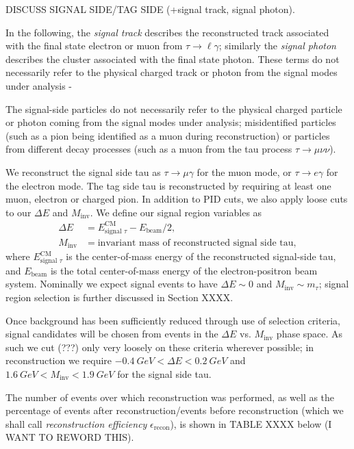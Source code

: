 \documentclass[12pt]{thesis}  %
\begin{document}
DISCUSS SIGNAL SIDE/TAG SIDE (+signal track, signal photon).


In the following, the \emph{signal track} describes the reconstructed track associated with the final state electron or muon from $\tau\to\ell\gamma$; similarly the \emph{signal photon} describes the cluster associated with the final state photon. These terms do not necessarily refer to the physical charged track or photon from the signal modes under analysis - 

The signal-side particles do not necessarily refer to the physical charged particle or photon coming from the signal modes under analysis; misidentified particles (such as a pion being identified as a muon during reconstruction) or particles from different decay processes (such as a muon from the tau process $\tau\to\mu\nu\nu$).


We reconstruct the signal side tau as $\tau \to \mu \gamma$ for the muon mode, or $\tau \to e \gamma$ for the electron mode. The tag side tau is reconstructed by requiring at least one muon, electron or charged pion. In addition to PID cuts, we also apply loose cuts to our $\Delta E$ and $M_{\text{inv}}$. We define our signal region variables as
\begin{align}
\Delta E &= E^{\text{CM}}_{\text{signal }\tau} - E_{\text{beam}}/2,\\
M_{\text{inv}} &= \text{invariant mass of reconstructed signal side tau},
\end{align}
where $E^{\text{CM}}_{\text{signal }\tau}$ is the center-of-mass energy of the reconstructed signal-side tau, and $E_{\text{beam}}$ is the total center-of-mass energy of the electron-positron beam system. Nominally we expect signal events to have $\Delta E\sim 0$ and $M_{\text{inv}}\sim m_{\tau}$; signal region selection is further discussed in Section XXXX.

Once background has been sufficiently reduced through use of selection criteria, signal candidates will be chosen from events in the $\Delta E$ vs. $M_{\text{inv}}$ phase space. As such we cut (???) only very loosely on these criteria wherever possible; in reconstruction we require $\SI{-0.4}{GeV} < \Delta E < \SI{0.2}{GeV}$ and $\SI{1.6}{GeV} < M_{\text{inv}} < \SI{1.9}{GeV}$ for the signal side tau. 

The number of events over which reconstruction was performed, as well as the percentage of events after reconstruction/events before reconstruction (which we shall call \emph{reconstruction efficiency} $\epsilon_{\text{recon}}$), is shown in TABLE XXXX below (I WANT TO REWORD THIS).
\end{document}

